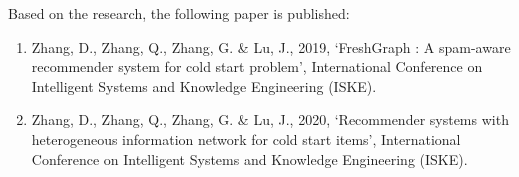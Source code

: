 \bigskip
\bigskip
Based on the research, the following paper is published:
\begin{enumerate}
    \item Zhang, D., Zhang, Q., Zhang, G. \& Lu, J., 2019,  ‘FreshGraph :  A spam-aware recommender system for cold start problem’, International Conference on Intelligent Systems and Knowledge Engineering (ISKE).
    \item Zhang, D., Zhang, Q., Zhang, G. \& Lu, J., 2020, ‘Recommender systems with heterogeneous information network for cold start items’, International Conference on Intelligent Systems and Knowledge Engineering (ISKE).
\end{enumerate}
 
